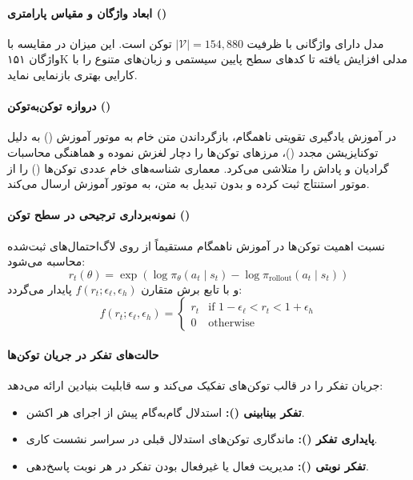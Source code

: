 \item {}

\paragraph*{ابعاد واژگان و مقیاس پارامتری ()}
مدل  \cite{glm2026glm5} دارای واژگانی با ظرفیت $|\mathcal{V}| = 154{,}880$ توکن است. این میزان در مقایسه با واژگان ۱۵۱K مدلی  افزایش یافته تا کدهای سطح پایین سیستمی و زبان‌های متنوع را با کارایی بهتری بازنمایی نماید.

\paragraph*{دروازه توکن‌به‌توکن ()}
در آموزش یادگیری تقویتی ناهمگام، بازگرداندن متن خام به موتور آموزش () به دلیل توکنایزیشن مجدد ()، مرزهای توکن‌ها را دچار لغزش نموده و هماهنگی محاسبات گرادیان و پاداش را متلاشی می‌کرد. معماری  شناسه‌های خام عددی توکن‌ها () را از موتور استنتاج ثبت کرده و بدون تبدیل به متن، به موتور آموزش ارسال می‌کند.

\paragraph*{نمونه‌برداری ترجیحی در سطح توکن ()}
نسبت اهمیت توکن‌ها در آموزش ناهمگام مستقیماً از روی لاگ‌احتمال‌های ثبت‌شده محاسبه می‌شود:
\begin{equation}
    r_t(\theta) = \exp\left(\log \pi_\theta(a_t \mid s_t) - \log \pi_{\text{rollout}}(a_t \mid s_t)\right)
\end{equation}
و با تابع برش متقارن $f(r_t; \epsilon_\ell, \epsilon_h)$ پایدار می‌گردد:
\begin{equation}
    f(r_t; \epsilon_\ell, \epsilon_h) = \begin{cases} 
        r_t & \text{if } 1 - \epsilon_\ell < r_t < 1 + \epsilon_h \\
        0 & \text{otherwise}
    \end{cases}
\end{equation}

\paragraph*{حالت‌های تفکر در جریان توکن‌ها}
 جریان تفکر را در قالب توکن‌های  تفکیک می‌کند و سه قابلیت بنیادین ارائه می‌دهد:
\begin{itemize}
    \item \textbf{تفکر بینابینی ():} استدلال گام‌به‌گام پیش از اجرای هر اکشن.
    \item \textbf{پایداری تفکر ():} ماندگاری توکن‌های استدلال قبلی در سراسر نشست کاری.
    \item \textbf{تفکر نوبتی ():} مدیریت فعال یا غیرفعال بودن تفکر در هر نوبت پاسخ‌دهی.
\end{itemize}

